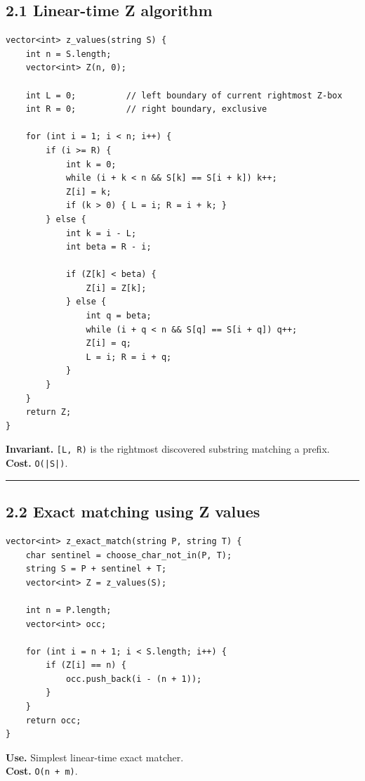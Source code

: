 \documentclass[11pt]{article}
\begin{document}
\subsection{2.1 Linear-time Z algorithm}\label{linear-time-z-algorithm}

\begin{verbatim}
vector<int> z_values(string S) {
    int n = S.length;
    vector<int> Z(n, 0);

    int L = 0;          // left boundary of current rightmost Z-box
    int R = 0;          // right boundary, exclusive

    for (int i = 1; i < n; i++) {
        if (i >= R) {
            int k = 0;
            while (i + k < n && S[k] == S[i + k]) k++;
            Z[i] = k;
            if (k > 0) { L = i; R = i + k; }
        } else {
            int k = i - L;
            int beta = R - i;

            if (Z[k] < beta) {
                Z[i] = Z[k];
            } else {
                int q = beta;
                while (i + q < n && S[q] == S[i + q]) q++;
                Z[i] = q;
                L = i; R = i + q;
            }
        }
    }
    return Z;
}
\end{verbatim}

\textbf{Invariant.} \texttt{[L, R)} is the rightmost discovered substring matching a prefix.\\
\textbf{Cost.} \texttt{O(|S|)}.

\begin{center}\rule{0.5\linewidth}{0.5pt}\end{center}

\subsection{2.2 Exact matching using Z values}\label{exact-matching-using-z-values}

\begin{verbatim}
vector<int> z_exact_match(string P, string T) {
    char sentinel = choose_char_not_in(P, T);
    string S = P + sentinel + T;
    vector<int> Z = z_values(S);

    int n = P.length;
    vector<int> occ;

    for (int i = n + 1; i < S.length; i++) {
        if (Z[i] == n) {
            occ.push_back(i - (n + 1));
        }
    }
    return occ;
}
\end{verbatim}

\textbf{Use.} Simplest linear-time exact matcher.\\
\textbf{Cost.} \texttt{O(n + m)}.
\end{document}
